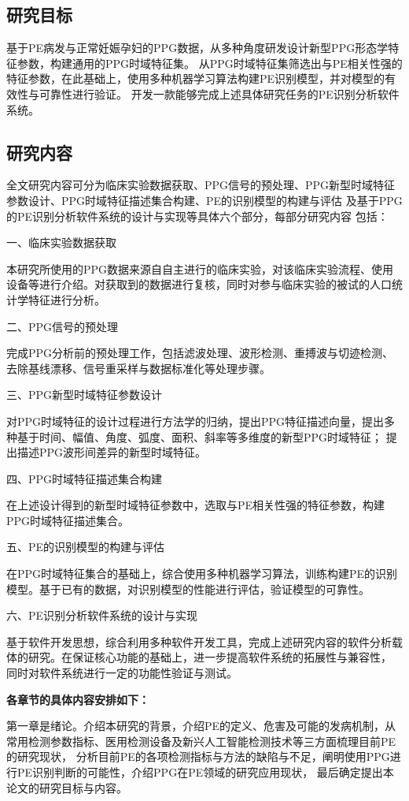 \subsection{研究目标}
基于PE病发与正常妊娠孕妇的PPG数据，从多种角度研发设计新型PPG形态学特征参数，构建通用的PPG时域特征集。
从PPG时域特征集筛选出与PE相关性强的特征参数，在此基础上，使用多种机器学习算法构建PE识别模型，并对模型的有效性与可靠性进行验证。
开发一款能够完成上述具体研究任务的PE识别分析软件系统。
\subsection{研究内容}
全文研究内容可分为临床实验数据获取、PPG信号的预处理、PPG新型时域特征参数设计、PPG时域特征描述集合构建、PE的识别模型的构建与评估
及基于PPG的PE识别分析软件系统的设计与实现等具体六个部分，每部分研究内容
包括：

一、临床实验数据获取

本研究所使用的PPG数据来源自自主进行的临床实验，对该临床实验流程、使用设备等进行介绍。对获取到的数据进行复核，同时对参与临床实验的被试的人口统计学特征进行分析。

二、PPG信号的预处理

完成PPG分析前的预处理工作，包括滤波处理、波形检测、重搏波与切迹检测、去除基线漂移、信号重采样与数据标准化等处理步骤。

三、PPG新型时域特征参数设计

对PPG时域特征的设计过程进行方法学的归纳，提出PPG特征描述向量，提出多种基于时间、幅值、角度、弧度、面积、斜率等多维度的新型PPG时域特征；
提出描述PPG波形间差异的新型时域特征。

四、PPG时域特征描述集合构建

在上述设计得到的新型时域特征参数中，选取与PE相关性强的特征参数，构建PPG时域特征描述集合。

五、PE的识别模型的构建与评估

在PPG时域特征集合的基础上，综合使用多种机器学习算法，训练构建PE的识别模型。基于已有的数据，对识别模型的性能进行评估，验证模型的可靠性。

六、PE识别分析软件系统的设计与实现

基于软件开发思想，综合利用多种软件开发工具，完成上述研究内容的软件分析载体的研究。在保证核心功能的基础上，进一步提高软件系统的拓展性与兼容性，
同时对软件系统进行一定的功能性验证与测试。

\textbf{各章节的具体内容安排如下：}

第一章是绪论。介绍本研究的背景，介绍PE的定义、危害及可能的发病机制，从常用检测参数指标、医用检测设备及新兴人工智能检测技术等三方面梳理目前PE的研究现状，
分析目前PE的各项检测指标与方法的缺陷与不足，阐明使用PPG进行PE识别判断的可能性，介绍PPG在PE领域的研究应用现状，
最后确定提出本论文的研究目标与内容。

